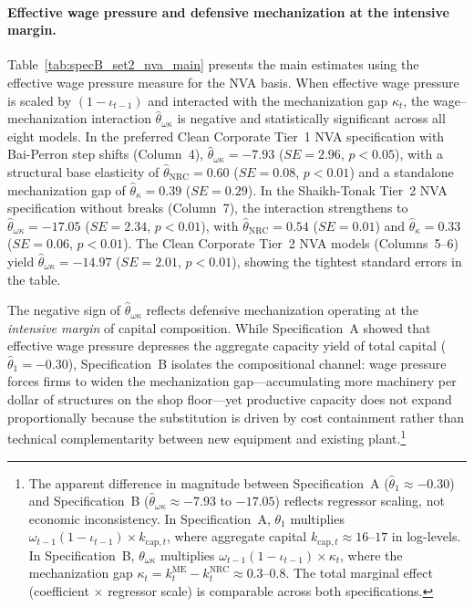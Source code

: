 \paragraph{Effective wage pressure and defensive mechanization at the intensive margin.}
Table~\ref{tab:specB_set2_nva_main} presents the main estimates using the effective wage pressure measure for the NVA basis. When effective wage pressure is scaled by $(1-\iota_{t-1})$ and interacted with the mechanization gap $\kappa_t$, the wage--mechanization interaction $\hat{\theta}_{\omega\kappa}$ is negative and statistically significant across all eight models. In the preferred Clean Corporate Tier~1 NVA specification with Bai-Perron step shifts (Column~4), $\hat{\theta}_{\omega\kappa} = -7.93$ ($SE = 2.96$, $p < 0.05$), with a structural base elasticity of $\hat{\theta}_{\text{NRC}} = 0.60$ ($SE = 0.08$, $p < 0.01$) and a standalone mechanization gap of $\hat{\theta}_\kappa = 0.39$ ($SE = 0.29$). In the Shaikh-Tonak Tier~2 NVA specification without breaks (Column~7), the interaction strengthens to $\hat{\theta}_{\omega\kappa} = -17.05$ ($SE = 2.34$, $p < 0.01$), with $\hat{\theta}_{\text{NRC}} = 0.54$ ($SE = 0.01$) and $\hat{\theta}_\kappa = 0.33$ ($SE = 0.06$, $p < 0.01$). The Clean Corporate Tier~2 NVA models (Columns~5--6) yield $\hat{\theta}_{\omega\kappa} = -14.97$ ($SE = 2.01$, $p < 0.01$), showing the tightest standard errors in the table.

The negative sign of $\hat{\theta}_{\omega\kappa}$ reflects defensive mechanization operating at the \emph{intensive margin} of capital composition. While Specification~A showed that effective wage pressure depresses the aggregate capacity yield of total capital ($\hat{\theta}_1 = -0.30$), Specification~B isolates the compositional channel: wage pressure forces firms to widen the mechanization gap---accumulating more machinery per dollar of structures on the shop floor---yet productive capacity does not expand proportionally because the substitution is driven by cost containment rather than technical complementarity between new equipment and existing plant.\footnote{The apparent difference in magnitude between Specification~A ($\hat{\theta}_1 \approx -0.30$) and Specification~B ($\hat{\theta}_{\omega\kappa} \approx -7.93$ to $-17.05$) reflects regressor scaling, not economic inconsistency. In Specification~A, $\theta_1$ multiplies $\omega_{t-1}(1-\iota_{t-1}) \times k_{\text{cap},t}$, where aggregate capital $k_{\text{cap},t} \approx 16$--$17$ in log-levels. In Specification~B, $\theta_{\omega\kappa}$ multiplies $\omega_{t-1}(1-\iota_{t-1}) \times \kappa_t$, where the mechanization gap $\kappa_t = k^{\text{ME}}_t - k^{\text{NRC}}_t \approx 0.3$--$0.8$. The total marginal effect (coefficient $\times$ regressor scale) is comparable across both specifications.}

